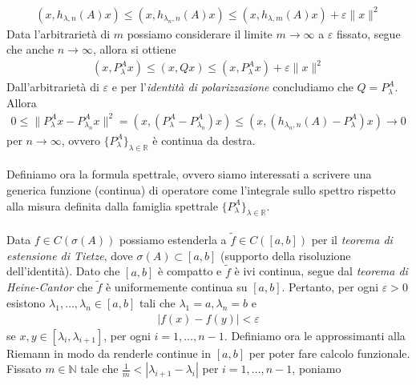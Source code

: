 \documentclass{article}
\numberwithin{equation}{subsection}
\begin{document}
\begin{align*}
    (x, h_{\lambda, n}(A)x) \leq (x, h_{\lambda_n, n}(A)x) \leq (x, h_{\lambda, m}(A)x) + \varepsilon\|x\|^2 
\end{align*}
Data l'arbitrarietà di $m$ possiamo considerare il limite $m \rightarrow \infty$ a $\varepsilon$ fissato, segue che anche $n \rightarrow \infty$, allora si ottiene 
\begin{align*}
    (x, P^A_\lambda x) \leq (x, Qx) \leq (x, P^A_\lambda x) + \varepsilon\|x\|^2 
\end{align*}
Dall'arbitrarietà di $\varepsilon$ e per l'\textit{identità di polarizzazione} concludiamo che $Q = P^A_\lambda$. Allora 
\begin{align*}
    0 \leq \|P^A_\lambda x - P^A_{\lambda_n}x\|^2 = (x, (P^A_\lambda - P^A_{\lambda_n})x) \leq (x, (h_{\lambda_n, n}(A) - P^A_\lambda)x) \rightarrow 0 
\end{align*}
per $n \rightarrow \infty$, ovvero $\{P^A_\lambda\}_{\lambda \in \mathbb{R}}$ è continua da destra. \\ \\
Definiamo ora la formula spettrale, ovvero siamo interessati a scrivere una generica funzione (continua) di operatore come l'integrale sullo spettro rispetto alla misura definita dalla famiglia spettrale $\{P^A_\lambda\}_{\lambda \in \mathbb{R}}$. \\ \\
Data $f \in C(\sigma(A))$ possiamo estenderla a $\widetilde{f} \in C([a, b])$ per il \textit{teorema di estensione di Tietze}, dove $\sigma(A) \subset [a, b]$ (supporto della risoluzione dell'identità). Dato che $[a, b]$ è compatto e $\widetilde{f}$ è ivi continua, segue dal \textit{teorema di Heine-Cantor} che $\widetilde{f}$ è uniformemente continua su $[a, b]$. Pertanto, per ogni $\varepsilon > 0$ esistono $\lambda_1, \dots, \lambda_n \in [a, b]$ tali che $\lambda_1 = a, \lambda_n = b$ e
\begin{align*}
    |f(x) - f(y)| < \varepsilon 
\end{align*}
se $x, y \in [\lambda_i, \lambda_{i + 1}]$, per ogni $i = 1, \dots, n - 1$. Definiamo ora le approssimanti alla Riemann in modo da renderle continue in $[a, b]$ per poter fare calcolo funzionale. Fissato $m \in \mathbb{N}$ tale che $\frac{1}{m} < |\lambda_{i + 1} - \lambda_i|$ per $i = 1, \dots, n - 1$, poniamo 
\end{document}

